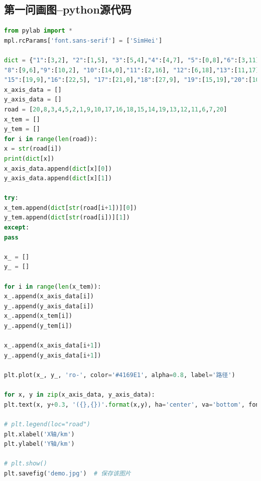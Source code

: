 \documentclass{whutmod}
\begin{document}
\subsection{第一问画图--python源代码}
\begin{lstlisting}[language=python]
from pylab import *
mpl.rcParams['font.sans-serif'] = ['SimHei']

dict = {"1":[3,2], "2":[1,5], "3":[5,4],"4":[4,7], "5":[0,8],"6":[3,11],"7":[7,9],
"8":[9,6],"9":[10,2], "10":[14,0],"11":[2,16], "12":[6,18],"13":[11,17],"14":[15,12],
"15":[19,9],"16":[22,5], "17":[21,0],"18":[27,9], "19":[15,19],"20":[10,10],}
x_axis_data = []
y_axis_data = []
road = [20,8,3,4,5,2,1,9,10,17,16,18,15,14,19,13,12,11,6,7,20]
x_tem = []
y_tem = []
for i in range(len(road)):
x = str(road[i])
print(dict[x])
x_axis_data.append(dict[x][0])
y_axis_data.append(dict[x][1])

try:
x_tem.append(dict[str(road[i+1])][0])
y_tem.append(dict[str(road[i])][1])
except:
pass

x_ = []
y_ = []

for i in range(len(x_tem)):
x_.append(x_axis_data[i])
y_.append(y_axis_data[i])
x_.append(x_tem[i])
y_.append(y_tem[i])

x_.append(x_axis_data[i+1])
y_.append(y_axis_data[i+1])

plt.plot(x_, y_, 'ro-', color='#4169E1', alpha=0.8, label='路径')

for x, y in zip(x_axis_data, y_axis_data):
plt.text(x, y+0.3, '({},{})'.format(x,y), ha='center', va='bottom', fontsize=10.5)

# plt.legend(loc="road")
plt.xlabel('X轴/km')
plt.ylabel('Y轴/km')

# plt.show()
plt.savefig('demo.jpg')  # 保存该图片
\end{lstlisting}
\end{document}

